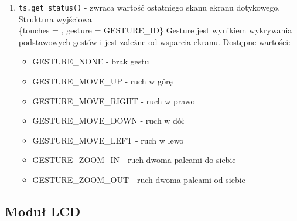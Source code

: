 \documentclass{article}
\begin{document}
\begin{enumerate}
  \item \texttt{ts.get\_status()} - zwraca wartość ostatniego skanu ekranu dotykowego. Struktura wyjściowa\\
  \{touches = \big[\{x = 123, y = 123\}, \{\ldots\} \ldots\big], gesture = GESTURE\_ID\}
  Gesture jest wynikiem wykrywania podstawowych gestów i jest zależne od wsparcia ekranu. Dostępne wartości:
  \begin{itemize}
    \item GESTURE\_NONE - brak gestu
    \item GESTURE\_MOVE\_UP - ruch w górę
    \item GESTURE\_MOVE\_RIGHT - ruch w prawo
    \item GESTURE\_MOVE\_DOWN - ruch w dół
    \item GESTURE\_MOVE\_LEFT - ruch w lewo
    \item GESTURE\_ZOOM\_IN - ruch dwoma palcami do siebie
    \item GESTURE\_ZOOM\_OUT - ruch dwoma palcami od siebie
  \end{itemize}
\end{enumerate}

\subsection{Moduł LCD}
\end{document}
